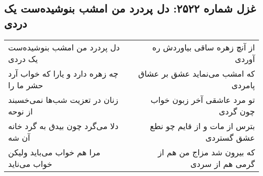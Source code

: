\begin{center}
\section*{غزل شماره ۲۵۲۲: دل پردرد من امشب بنوشیده‌ست یک دردی}
\label{sec:2522}
\begin{longtable}{l p{0.5cm} r}
دل پردرد من امشب بنوشیده‌ست یک دردی
&&
از آنچ زهره ساقی بیاوردش ره آوردی
\\
چه زهره دارد و یارا که خواب آرد حشر ما را
&&
که امشب می‌نماید عشق بر عشاق پامردی
\\
زنان در تعزیت شب‌ها نمی‌خسبند از نوحه
&&
تو مرد عاشقی آخر زبون خواب چون گردی
\\
دلا می‌گرد چون بیدق به گرد خانه آن شه
&&
بترس از مات و از قایم چو نطع عشق گستردی
\\
مرا هم خواب می‌باید ولیکن خواب می‌ناید
&&
که بیرون شد مزاج من هم از گرمی هم از سردی
\\
\end{longtable}
\end{center}
